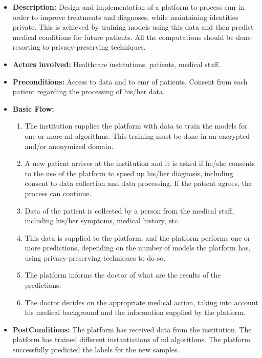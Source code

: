 \begin{itemize}
	

	\item \textbf{Description:} Design and implementation of a platform to process \ac{emr} in order to improve treatments and diagnoses, while maintaining identities private. This is achieved by training models using this data and then predict medical conditions for future patients. All the computations should be done resorting to privacy-preserving techniques.

	\item \textbf{Actors involved:} Healthcare institutions, patients, medical staff.

	\item \textbf{Preconditions:} Access to data and to \ac{emr} of patients. Consent from each patient regarding the processing of his/her data.

	\item \textbf{Basic Flow:} 
	
	\begin{enumerate}
		\item The institution supplies the platform with data to train the models for one or more \ac{ml} algorithms. This training must be done in an encrypted and/or anonymized domain.

		\item A new patient arrives at the institution and it is asked if he/she consents to the use of the platform to speed up his/her diagnosis, including consent to data collection and data processing. If the patient agrees, the process can continue.

		\item Data of the patient is collected by a person from the medical staff, including his/her symptoms, medical history, etc.

		\item This data is supplied to the platform, and the platform performs one or more predictions, depending on the number of models the platform has, using privacy-preserving techniques to do so.

		\item The platform informs the doctor of what are the results of the predictions.

		\item The doctor decides on the appropriate medical action, taking into account his medical background and the information supplied by the platform.


	\end{enumerate}

	\item \textbf{PostConditions:} The platform has received data from the institution. The platform has trained different instantiations of \ac{ml} algorithms. The platform successfully predicted the labels for the new samples.

\end{itemize}





